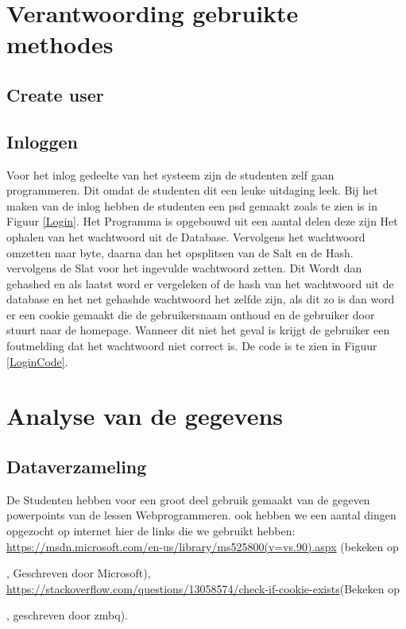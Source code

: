 \documentclass[11pt]{article}
\begin{document}
	\section{Verantwoording gebruikte methodes}
	\subsection{Create user}
	
	\subsection{Inloggen}
	Voor het inlog gedeelte van het systeem zijn de studenten zelf gaan programmeren. Dit omdat de studenten dit een leuke uitdaging leek. Bij het maken van de inlog hebben de studenten een psd gemaakt zoals te zien is in Figuur \ref{Login}. Het Programma is opgebouwd uit een aantal delen deze zijn Het ophalen van het wachtwoord uit de Database. Vervolgens het wachtwoord omzetten naar byte, daarna dan het opsplitsen van de Salt en de Hash. vervolgens de Slat voor het ingevulde wachtwoord zetten. Dit Wordt dan gehashed en als laatst word er vergeleken of de hash van het wachtwoord uit de database en het net gehashde wachtwoord het zelfde zijn, als dit zo is dan word er een cookie gemaakt die de gebruikersnaam onthoud en de gebruiker door stuurt naar de homepage. Wanneer dit niet het geval is krijgt de gebruiker een foutmelding dat het wachtwoord niet correct is. De code is te zien in Figuur \ref{LoginCode}.
	\newpage
	
	\section{Analyse van de gegevens}
	
	\subsection{Dataverzameling}
	De Studenten hebben voor een groot deel gebruik gemaakt van de gegeven powerpoints van de lessen Webprogrammeren. ook hebben we een aantal dingen opgezocht op internet hier de links die we gebruikt hebben: \url{https://msdn.microsoft.com/en-us/library/ms525800(v=vs.90).aspx} (bekeken op \date{19-01-2018}, Geschreven door Microsoft), \newline \url{https://stackoverflow.com/questions/13058574/check-if-cookie-exists}(Bekeken op \date{19-01-2018}, geschreven door zmbq).
	
\end{document}
